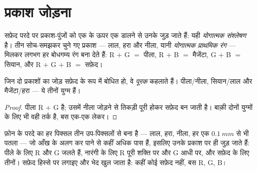 \section{प्रकाश जोड़ना}

\begin{definition}[योगात्मक संश्लेषण]\label{def:g11:color-light-sources:additive}
सफ़ेद परदे पर प्रकाश-पुंजों को एक के ऊपर एक डालने से उनके  जुड़
जाते हैं: यही \emph{योगात्मक संश्लेषण} है। तीन
सोच-समझकर चुने गए प्रकाश --- लाल, हरा और नीला, यानी \emph{योगात्मक
प्राथमिक रंग} --- मिलकर लगभग हर बोधगम्य रंग बना देते
हैं: R $+$ G $=$ पीला, R $+$ B $=$ मैजेंटा, G $+$ B $=$
सियान, और R $+$ G $+$ B $=$ सफ़ेद।
\end{definition}

\begin{proposition}[पूरक रंग]\label{prop:g11:color-light-sources:complementary}
जिन दो प्रकाशों का जोड़ सफ़ेद के रूप में बोधित हो, वे
\emph{पूरक} कहलाते हैं। पीला/नीला, सियान/लाल और
मैजेंटा/हरा --- ये तीनों युग्म  हैं।
\end{proposition}

\begin{proof}
पीला R $+$ G है; उसमें नीला जोड़ने से तिकड़ी पूरी होकर सफ़ेद बन जाती
है। बाक़ी दोनों युग्मों के लिए भी वही तर्क है, बस एक-एक 
लेकर।
\end{proof}

\begin{example}[परदे]\label{ex:g11:color-light-sources:screen}
फ़ोन के परदे का हर पिक्सल तीन उप-पिक्सलों से बना है --- लाल, हरा, नीला,
हर एक $\qty{0.1}{mm}$ से भी पतला --- जो आँख के अलग कर पाने से कहीं अधिक पास हैं,
इसलिए उनके प्रकाश  पर ही जुड़ जाते हैं: पीले के लिए R
और G जलते हैं, नारंगी के लिए R पूरी शक्ति पर और G आधी पर, और
सफ़ेद के लिए तीनों। सफ़ेद हिस्से पर  लगाइए और भेद खुल जाता है:
कहीं कोई सफ़ेद नहीं, बस R, G, B।
\end{example}

